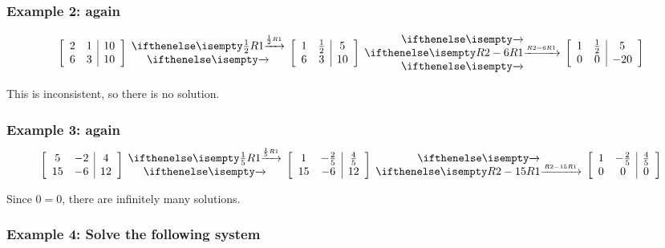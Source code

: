 \documentclass[
  letterpaper,
  DIV=11,
  numbers=noendperiod]{scrartcl}
\begin{document}
\hypertarget{example-2-again}{%
\subsubsection{Example 2: again}\label{example-2-again}}


\begin{align*}
\left[\begin{array}{cc|c}2 & 1 & 10 \\ 6 & 3 & 10 \end{array}\right] \rowops{\frac{1}{2}R1,} \left[\begin{array}{cc|c}1 & \frac{1}{2} & 5 \\ 6 & 3 & 10 \end{array}\right] \rowops{,R2-6R1,} \left[\begin{array}{cc|c}1 & \frac{1}{2} & 5 \\ 0 & 0 & -20 \end{array}\right]
\end{align*}

This is inconsistent, so there is no solution.

\hypertarget{example-3-again}{%
\subsubsection{Example 3: again}\label{example-3-again}}


\begin{align*}
\left[\begin{array}{cc|c}5 & -2 & 4 \\ 15 & -6 & 12\end{array}\right]\rowops{\frac{1}{5}R1,}\left[\begin{array}{cc|c}1 & -\frac{2}{5} & \frac{4}{5} \\ 15 & -6 & 12 \end{array}\right]\rowops{,R2-15R1}\left[\begin{array}{cc|c}1 & -\frac{2}{5} & \frac{4}{5} \\ 0 & 0 & 0 \end{array}\right]
\end{align*}

Since \(0 = 0\), there are infinitely many solutions.

\hypertarget{example-4-solve-the-following-system}{%
\subsubsection{Example 4: Solve the following
system}\label{example-4-solve-the-following-system}}
\end{document}
